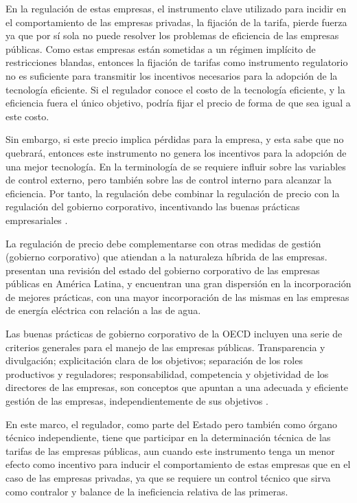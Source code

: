 \documentclass[
  12pt,
  spanish,
]{book}
\begin{document}
En la regulación de estas empresas, el instrumento clave utilizado para incidir en el comportamiento de las empresas privadas, la fijación de la tarifa, pierde fuerza ya que por sí sola no puede resolver los problemas de eficiencia de las empresas públicas. Como estas empresas están sometidas a un régimen implícito de restricciones blandas, entonces la fijación de tarifas como instrumento regulatorio no es suficiente para transmitir los incentivos necesarios para la adopción de la tecnología eficiente. Si el regulador conoce el costo de la tecnología eficiente, y la eficiencia fuera el único objetivo, podría fijar el precio de forma de que sea igual a este costo.

Sin embargo, si este precio implica pérdidas para la empresa, y esta sabe que no quebrará, entonces este instrumento no genera los incentivos para la adopción de una mejor tecnología. En la terminología de \citet{Laffont1993} se requiere influir sobre las variables de control externo, pero también sobre las de control interno para alcanzar la eficiencia. Por tanto, la regulación debe combinar la regulación de precio con la regulación del gobierno corporativo, incentivando las buenas prácticas empresariales \citep{Berg2013}.

La regulación de precio debe complementarse con otras medidas de gestión (gobierno corporativo) que atiendan a la naturaleza híbrida de las empresas. \citet{Andres2011} presentan una revisión del estado del gobierno corporativo de las empresas públicas en América Latina, y encuentran una gran dispersión en la incorporación de mejores prácticas, con una mayor incorporación de las mismas en las empresas de energía eléctrica con relación a las de agua.

Las buenas prácticas de gobierno corporativo de la OECD incluyen una serie de criterios generales para el manejo de las empresas públicas. Transparencia y divulgación; explicitación clara de los objetivos; separación de los roles productivos y reguladores; responsabilidad, competencia y objetividad de los directores de las empresas, son conceptos que apuntan a una adecuada y eficiente gestión de las empresas, independientemente de sus objetivos \citep{OECD2011}.

En este marco, el regulador, como parte del Estado pero también como órgano técnico independiente, tiene que participar en la determinación técnica de las tarifas de las empresas públicas, aun cuando este instrumento tenga un menor efecto como incentivo para inducir el comportamiento de estas empresas que en el caso de las empresas privadas, ya que se requiere un control técnico que sirva como contralor y balance de la ineficiencia relativa de las primeras.
\end{document}
